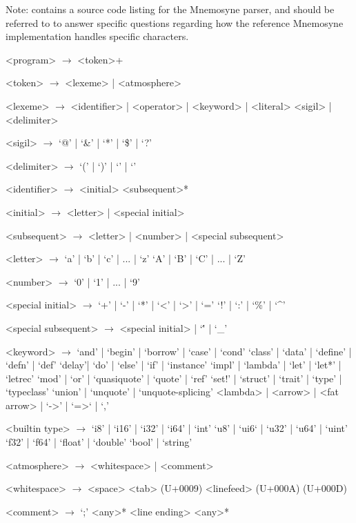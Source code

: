 Note:  contains a source code listing for the Mnemosyne parser, and should be referred to to answer specific questions regarding how the reference Mnemosyne implementation handles specific characters.

    \begin{grammar}
        <program> $\to$ <token>+

        <token> $\to$ <lexeme> | <atmosphere>

        <lexeme> $\to$ <identifier> | <operator> | <keyword> | <literal>
                    \alt <sigil> | <delimiter>

        <sigil> $\to$ `@' | `&' | `*' | `\$' | `?'

        <delimiter> $\to$ `(' | `)' | `{' | `}'

        <identifier> $\to$ <initial> <subsequent>*

        <initial> $\to$ <letter> | <special initial>

        <subsequent> $\to$ <letter> | <number> | <special subsequent>

        <letter> $\to$ `a' | `b' | `c' | ... | `z'
                 \alt `A' | `B' | `C' | ... | `Z'

        <number> $\to$ `0' | `1' | ... | `9'

        <special initial> $\to$ `+' | `-' | `*' | `<' | `>' | `='
                          \alt `!' | `:' | `\%' | `^'

        <special subsequent> $\to$ <special initial> | `\'' | `_'

        <keyword> $\to$ `and' | `begin'  | `borrow' | `case' | `cond'
                  \alt `class' | `data' | `define' | `defn' | `def'
                  \alt `delay'| `do' | `else' | `if' | `instance'
                  \alt `impl' | `lambda' | `let' | `let*' | `letrec'
                  \alt `mod' | `or' | `quasiquote' | `quote' | `ref'
                  \alt `set!' | `struct' | `trait' | `type' | `typeclass'
                  \alt `union' |  `unquote' | `unquote-splicing'
                  \alt <lambda> | <arrow> | <fat arrow>
                  \alt \lit{|}  | `->' | `=>` | `,'

        <builtin type> $\to$ `i8' | `i16' | `i32' | `i64' | `int'
                        \alt `u8' | `ui6` | `u32' | `u64' | `uint'
                        \alt `f32' | `f64' | `float' | `double'
                        \alt `bool' | `string'

        <atmosphere> $\to$ <whitespace> | <comment>

        <whitespace> $\to$ <space>
                    \alt <tab> (U+0009)
                    \alt <linefeed> (U+000A)
                     (U+000D)

        <comment> $\to$ `;' <any>* <line ending>
                  \alt \lit{\#|} <any>* \lit{|\#}

    \end{grammar}
